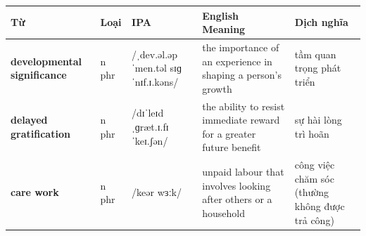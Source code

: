 \vspace{0.8em}
\begin{center}
\renewcommand{\arraystretch}{1.65}
\begin{tabularx}{\textwidth}{|V{0.22\textwidth}|C{0.07\textwidth}|I{0.20\textwidth}|Y|V{0.18\textwidth}|}
\hline
{}
\textbf{Từ} & \textbf{Loại} & \textbf{IPA} & \textbf{English Meaning} & \textbf{Dịch nghĩa} \\
\hline
\textbf{developmental significance} & n phr & /ˌdev.əl.əpˈmen.təl sɪɡˈnɪf.ɪ.kəns/ & the importance of an experience in shaping a person's growth & tầm quan trọng phát triển \\ \hline
\textbf{delayed gratification} & n phr & /dɪˈleɪd ˌɡræt.ɪ.fɪˈkeɪ.ʃən/ & the ability to resist immediate reward for a greater future benefit & sự hài lòng trì hoãn \\ \hline
\textbf{care work} & n phr & /keər wɜːk/ & unpaid labour that involves looking after others or a household & công việc chăm sóc (thường không được trả công) \\ \hline
\end{tabularx}
\end{center}

\newpage

